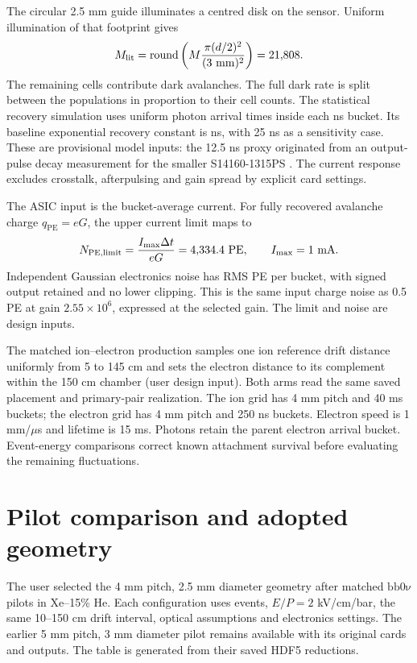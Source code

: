 \documentclass[11pt,a4paper]{article}
\newcommand{\num}[2][3]{\pgfmathprintnumber[fixed,precision=#1,fixed zerofill]{#2}}
\begin{document}
The circular 2.5 mm guide illuminates a centred disk on the sensor. Uniform
illumination of that footprint gives
\begin{equation}
 M_{\mathrm{lit}}=\operatorname{round}\left(M\frac{\pi(d/2)^2}{(3\ \mathrm{mm})^2}\right)
 =\num[0]{\elmIlluminatedMicrocells}.
\end{equation}
The remaining \num[0]{\elmDarkOnlyMicrocells} cells contribute dark avalanches.
The full dark rate is split between the populations in proportion to their
cell counts. The statistical recovery simulation uses uniform photon arrival
times inside each \num[0]{\elmBucketNS} ns bucket. Its baseline exponential
recovery constant is \num[1]{\elmRecoveryNS} ns, with 25 ns as a sensitivity
case. These are provisional model inputs: the 12.5 ns proxy originated from
an output-pulse decay measurement for the smaller S14160-1315PS
\cite{KlestZurekSiPMChoice}. The current response excludes crosstalk,
afterpulsing and gain spread by explicit card settings.

The ASIC input is the bucket-average current. For fully recovered avalanche
charge $q_{\mathrm{PE}}=eG$, the upper current limit maps to
\begin{equation}
 N_{\mathrm{PE,limit}}=\frac{I_{\max}\Delta t}{eG}
 =\num[1]{\elmClipThresholdPE}\ \mathrm{PE},
 \qquad I_{\max}=\num[0]{\elmCurrentLimitMA}\ \mathrm{mA}.
\end{equation}
Independent Gaussian electronics noise has RMS \num[4]{\elmNoisePE} PE per
bucket, with signed output retained and no lower clipping. This is the same
input charge noise as 0.5 PE at gain $2.55\times10^6$, expressed at the
selected gain. The limit and noise are design inputs.

The matched ion--electron production samples one ion reference drift distance
uniformly from 5 to 145 cm and sets the electron distance to its complement
within the 150 cm chamber (user design input). Both arms read the same saved
placement and primary-pair realization. The ion grid has 4 mm pitch and
40 ms buckets; the electron grid has 4 mm pitch and 250 ns buckets.
Electron speed is 1 mm/$\mu$s and lifetime is 15 ms. Photons retain the parent
electron arrival bucket. Event-energy comparisons correct known attachment
survival before evaluating the remaining fluctuations.

\section{Pilot comparison and adopted geometry}
The user selected the 4 mm pitch, 2.5 mm diameter geometry after matched
$\mathrm{bb0\nu}$ pilots in Xe--15\% He. Each configuration uses
\num[0]{\elmPilotFourEvents} events, $E/P=2$ kV/cm/bar, the same 10--150 cm drift
interval, optical assumptions and electronics settings. The earlier 5 mm
pitch, 3 mm diameter pilot remains available with its original cards and
outputs. The table is generated from their saved HDF5 reductions.
\end{document}
